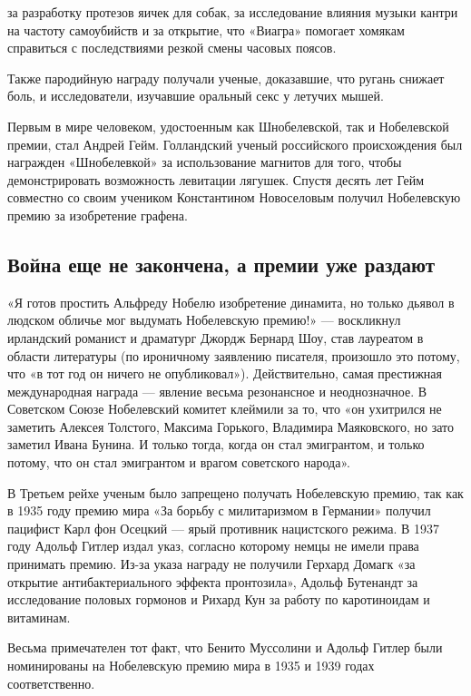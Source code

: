 за разработку протезов яичек для собак, за исследование влияния музыки кантри на частоту самоубийств и за открытие, что «Виагра» помогает хомякам справиться с последствиями резкой смены часовых поясов.

Также пародийную награду получали ученые, доказавшие, что ругань снижает боль, и исследователи, изучавшие оральный секс у летучих мышей.

Первым в мире человеком, удостоенным как Шнобелевской, так и Нобелевской премии, стал Андрей Гейм. Голландский ученый российского происхождения был награжден «Шнобелевкой» за использование магнитов для того, чтобы демонстрировать возможность левитации лягушек. Спустя десять лет Гейм совместно со своим учеником Константином Новоселовым получил Нобелевскую премию за изобретение графена.

\subsection{Война еще не закончена, а премии уже раздают}
«Я готов простить Альфреду Нобелю изобретение динамита, но только дьявол в людском обличье мог выдумать Нобелевскую премию!» --- воскликнул ирландский романист и драматург Джордж Бернард Шоу, став лауреатом в области литературы (по ироничному заявлению писателя, произошло это потому, что «в тот год он ничего не опубликовал»). Действительно, самая престижная международная награда --- явление весьма резонансное и неоднозначное. В Советском Союзе Нобелевский комитет клеймили за то, что «он ухитрился не заметить Алексея Толстого, Максима Горького, Владимира Маяковского, но зато заметил Ивана Бунина. И только тогда, когда он стал эмигрантом, и только потому, что он стал эмигрантом и врагом советского народа».

В Третьем рейхе ученым было запрещено получать Нобелевскую премию, так как в 1935 году премию мира «За борьбу с милитаризмом в Германии» получил пацифист Карл фон Осецкий --- ярый противник нацистского режима. В 1937 году Адольф Гитлер издал указ, согласно которому немцы не имели права принимать премию. Из-за указа награду не получили Герхард Домагк «за открытие антибактериального эффекта пронтозила», Адольф Бутенандт за исследование половых гормонов и Рихард Кун за работу по каротиноидам и витаминам.


\begin{fancyquotes}
    Весьма примечателен тот факт, что Бенито Муссолини и Адольф Гитлер были номинированы на Нобелевскую премию мира в 1935 и 1939 годах соответственно.
\end{fancyquotes}

